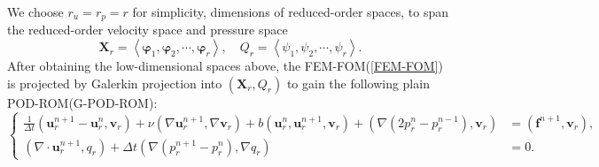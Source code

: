 \documentclass[10pt,twoside,openany,UTF8,CJK]{article}
\begin{document}
    We choose $r_u=r_p=r$ for simplicity, dimensions of reduced-order spaces, to span the reduced-order velocity space and pressure space
    $$
    \boldsymbol{X}_r=\left\langle\boldsymbol{\varphi}_1, \boldsymbol{\varphi}_2, \cdots, \boldsymbol{\varphi}_r\right\rangle, \quad Q_r=\left\langle\psi_1, \psi_2, \cdots, \psi_r\right\rangle.
    $$
    \indent After obtaining the low-dimensional spaces above, the FEM-FOM(\ref{FEM-FOM}) is projected by Galerkin projection into $(\boldsymbol{X}_r,Q_r)$ to gain the following plain POD-ROM(G-POD-ROM):
    \begin{equation}\label{G-POD-ROM}
    	\left\{
    	\begin{aligned}
    		\frac{1}{\Delta t}\left(\boldsymbol{u}_r^{n+1}-\boldsymbol{u}_r^n, \boldsymbol{v}_r\right) + \nu\left(\nabla \boldsymbol{u}_r^{n+1}, \nabla \boldsymbol{v}_r\right) + b\left(\boldsymbol{u}_r^n,\boldsymbol{u}_r^{n+1},\boldsymbol{v}_r\right) + \left(\nabla\left(2 p_r^n-p_r^{n-1}\right), \boldsymbol{v}_r\right) &=\left(\boldsymbol{f}^{n+1}, \boldsymbol{v}_r\right), \\
    		\left(\nabla \cdot \boldsymbol{u}_r^{n+1}, q_r\right) + \Delta t\left(\nabla\left(p_r^{n+1}-p_r^n\right), \nabla q_r\right) &= 0.
    	\end{aligned}
    	\right.
    \end{equation}
    
\end{document}
